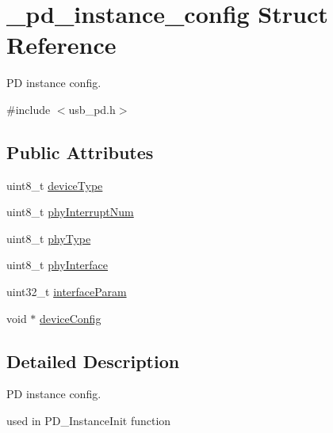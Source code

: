 \hypertarget{struct__pd__instance__config}{\section{\-\_\-pd\-\_\-instance\-\_\-config Struct Reference}
\label{struct__pd__instance__config}
}


P\-D instance config.  




{\ttfamily \#include $<$usb\-\_\-pd.\-h$>$}

\subsection*{Public Attributes}
\begin{DoxyCompactItemize}
\item 
uint8\-\_\-t \hyperlink{struct__pd__instance__config_a68e8aae835b95ae67d48701973864acf}{device\-Type}
\item 
uint8\-\_\-t \hyperlink{struct__pd__instance__config_a131f930f58f1a9bfe1488acb62aa2725}{phy\-Interrupt\-Num}
\item 
uint8\-\_\-t \hyperlink{struct__pd__instance__config_a1f5e597bbfc0af871a5e887c34eb3aca}{phy\-Type}
\item 
uint8\-\_\-t \hyperlink{struct__pd__instance__config_acb93f9cec67a95c40730be43c80d3214}{phy\-Interface}
\item 
uint32\-\_\-t \hyperlink{struct__pd__instance__config_a7e72c5dda8b81981ebd3062f6999bce1}{interface\-Param}
\item 
void $\ast$ \hyperlink{struct__pd__instance__config_a1aa5e1d3d8e54bcaa77f41a6de3eb371}{device\-Config}
\end{DoxyCompactItemize}


\subsection{Detailed Description}
P\-D instance config. 

used in P\-D\-\_\-\-Instance\-Init function 

